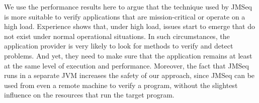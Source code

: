 We use the performance results here to argue that the technique used by JMSeq is more suitable to verify applications that are mission-critical or operate on a high load.
Experience shows that, under high load, issues start to emerge that do not exist under normal operational situations.
In such circumstances, the application provider is very likely to look for methods to verify and detect problems.
And yet, they need to make sure that the application remains at least at the same level of execution and performance.
Moreover, the fact that JMSeq runs in a separate JVM increases the safety of our approach, since
JMSeq can be used from even a remote machine to verify a program, without the slightest influence on the resources that run the target program.



